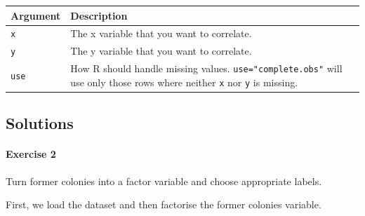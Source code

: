 \documentclass[]{article}
\let\oldparagraph\paragraph
\renewcommand{\paragraph}[1]{\oldparagraph{#1}\mbox{}}
\theoremstyle{definition}
\theoremstyle{definition}
\theoremstyle{definition}
\theoremstyle{remark}
\begin{document}
\begin{longtable}[]{@{}ll@{}}
\toprule
\begin{minipage}[b]{0.12\columnwidth}\raggedright\strut
Argument\strut
\end{minipage} & \begin{minipage}[b]{0.78\columnwidth}\raggedright\strut
Description\strut
\end{minipage}\tabularnewline
\midrule
\endhead
\begin{minipage}[t]{0.12\columnwidth}\raggedright\strut
\texttt{x}\strut
\end{minipage} & \begin{minipage}[t]{0.78\columnwidth}\raggedright\strut
The x variable that you want to correlate.\strut
\end{minipage}\tabularnewline
\begin{minipage}[t]{0.12\columnwidth}\raggedright\strut
\texttt{y}\strut
\end{minipage} & \begin{minipage}[t]{0.78\columnwidth}\raggedright\strut
The y variable that you want to correlate.\strut
\end{minipage}\tabularnewline
\begin{minipage}[t]{0.12\columnwidth}\raggedright\strut
\texttt{use}\strut
\end{minipage} & \begin{minipage}[t]{0.78\columnwidth}\raggedright\strut
How R should handle missing values. \texttt{use="complete.obs"} will use
only those rows where neither \texttt{x} nor \texttt{y} is
missing.\strut
\end{minipage}\tabularnewline
\bottomrule
\end{longtable}

\subsection{Solutions}\label{solutions-3}

\paragraph{Exercise 2}\label{exercise-2-2}

Turn former colonies into a factor variable and choose appropriate
labels.

First, we load the dataset and then factorise the former colonies
variable.
\end{document}
